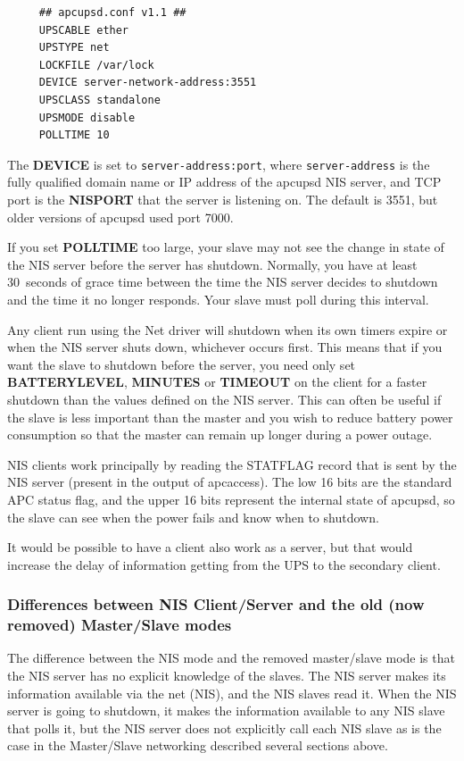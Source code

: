 \footnotesize
\begin{verbatim}
     ## apcupsd.conf v1.1 ##
     UPSCABLE ether
     UPSTYPE net
     LOCKFILE /var/lock
     DEVICE server-network-address:3551
     UPSCLASS standalone
     UPSMODE disable
     POLLTIME 10
\end{verbatim}
\normalsize

The \textbf{DEVICE} is set to \texttt{server-address:port}, where
\texttt{server-address} is the fully qualified domain name or IP address of
the apcupsd NIS server, and TCP port is the \textbf{NISPORT} that the server
is listening on.  The default is 3551, but older versions of apcupsd used
port 7000.  

If you set \textbf{POLLTIME} too large, your slave may not see the
change in state of the NIS server before the server has shutdown. Normally,
you have at least 30~seconds of grace time between the time the NIS server
decides to shutdown and the time it no longer responds. Your slave must poll
during this interval.  

Any client run using the Net driver will shutdown when its own timers
expire or when the NIS server shuts down, whichever occurs first. This
means that if you want the slave to shutdown before the server, you need
only set \textbf{BATTERYLEVEL}, \textbf{MINUTES} or \textbf{TIMEOUT} on
the client for a faster shutdown than the values defined on the NIS
server.  This can often be useful if the slave is less important than the
master and you wish to reduce battery power consumption so that the
master can remain up longer during a power outage. 

NIS clients work principally by reading the STATFLAG record that is sent
by the NIS server (present in the output of apcaccess). The low 16 bits
are the standard APC status flag, and the upper 16 bits represent the
internal state of apcupsd, so the slave can see when the power fails and
know when to shutdown.  

It would be possible to have a client also work as a server, but that would
increase the delay of information getting from the UPS to the secondary
client.

\subsubsection*{Differences between NIS Client/Server and the old 
(now removed) Master/Slave modes}

The difference between the NIS mode and the removed master/slave mode
is that the NIS server has no explicit knowledge of the slaves. The NIS
server makes its information available via the net (NIS), and the NIS
slaves read it.  When the NIS server is going to shutdown, it makes the
information available to any NIS slave that polls it, but the NIS server
does not explicitly call each NIS slave as is the case in the
Master/Slave networking described several sections above.  

